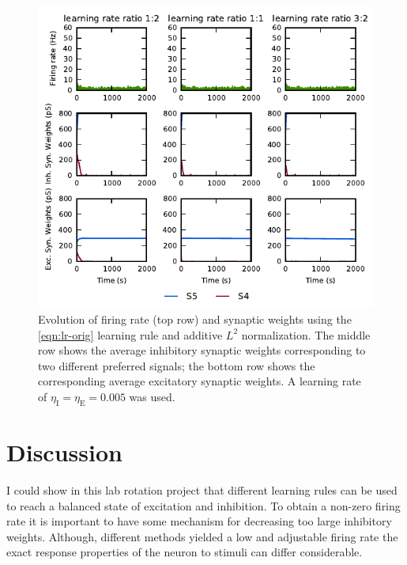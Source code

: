 \documentclass[11pt,a4paper]{scrartcl}
\newcommand{\I}[1]{_{\text{I}#1}}
\newcommand{\E}[1]{_{\text{E}#1}}
\begin{document}
\begin{figure}
    \centering
    \includegraphics[scale=0.9]{figures/exc-stdp-add-l2}
    \caption{Evolution of firing rate (top row) and synaptic weights using the 
        \ref{eqn:lr-orig} learning rule and additive $L^2$ normalization.  The 
        middle row shows the average inhibitory synaptic weights corresponding 
        to two different preferred signals; the bottom row shows the 
        corresponding average excitatory synaptic weights. A learning rate of 
        $\eta\I{} = \eta\E{} = 0.005$ was used.}
    \label{fig:exc-stdp-add-l2}
\end{figure}

\section{Discussion} \label{sec:discussion}
I could show in this lab rotation project that different learning rules can be 
used to reach a balanced state of excitation and inhibition. To obtain 
a non-zero firing rate it is important to have some mechanism for decreasing too 
large inhibitory weights. Although, different methods yielded a low and 
adjustable firing rate the exact response properties of the neuron to stimuli 
can differ considerable.
\end{document}
